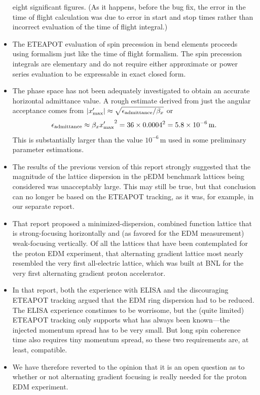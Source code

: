 \documentclass[]{article}
\begin{document}
\begin{itemize}
eight significant figures. (As it happens, before the bug fix, the 
error in the time of flight calculation was due to error in 
start and stop times rather than incorrect evaluation of the
time of flight integral.)
\item
The ETEAPOT evaluation of spin precession in bend elements proceeds
using formalism just like the time of flight formalism. The
spin precession integrals are elementary and do not require either 
approximate or power series evaluation to be expressable in 
exact closed form.  
\item
The phase space has not been adequately investigated to obtain
an accurate horizontal admittance value. A rough estimate 
derived from just the angular acceptance comes from
$|x'_{\rm max}|\approx\sqrt{\epsilon_{\rm admittance}/\beta_x}$ or 
%
\begin{equation}
\epsilon_{\rm admittance}
\approx
\beta_x{x'_{\rm max}}^2
 =
36\times0.0004^2
 =
5.8\times10^{-6}\,{\rm m}.
\label{eq:Comments.1} 
\end{equation}
%
This is substantially larger than the value $10^{-6}\,${\rm m} used
in some preliminary parameter estimations.
\item
The results of the previous version of this report strongly 
suggested that the magnitude of the lattice dispersion in the 
pEDM benchmark lattices being considered was unacceptably large. 
This may still be true, but that conclusion can no longer
be based on the ETEAPOT tracking, as it was, for example, in 
our separate report\cite{RTMinimumDispersion}.
\item
That report proposed a minimized-dispersion, combined function 
lattice that is strong-focusing horizontally and
(as favored for the EDM measurement) weak-focusing vertically.
Of all the lattices that have been contemplated for the proton
EDM experiment, that alternating gradient lattice most nearly 
resembled the very first all-electric lattice, which was built at 
BNL for the very first alternating gradient proton 
accelerator\cite{Plotkin}.
\item
In that report, both the experience with ELISA and the discouraging
ETEAPOT tracking argued that the EDM ring dispersion had to be 
reduced. The ELISA experience constinues to be worrisome, but the 
(quite limited) ETEAPOT tracking only supports what has
always been known---the injected momentum spread has to be very
small. But long spin coherence time also requires tiny momentum
spread, so these two requirements are, at least, compatible. 
\item
We have therefore reverted to the opinion that it is an open question 
as to whether or not alternating gradient focusing is really 
needed for the proton EDM experiment.
\end{itemize}
%
\end{document}
